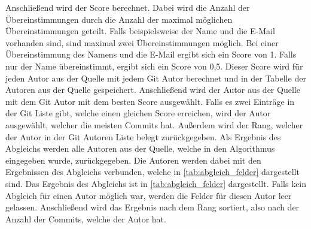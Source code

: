 Anschließend wird der Score berechnet.
Dabei wird die Anzahl der Übereinstimmungen durch die Anzahl der maximal möglichen Übereinstimmungen geteilt.
Falls beispielsweise der Name und die E-Mail vorhanden sind, sind maximal zwei Übereinstimmungen möglich.
Bei einer Übereinstimmung des Namens und die E-Mail ergibt sich ein Score von 1.
Falls nur der Name übereinstimmt, ergibt sich ein Score von 0,5.
Dieser Score wird für jeden Autor aus der Quelle mit jedem Git Autor berechnet und in der Tabelle der Autoren aus der Quelle gespeichert.
Anschließend wird der Autor aus der Quelle mit dem Git Autor mit dem besten Score ausgewählt.
Falls es zwei Einträge in der Git Liste gibt, welche einen gleichen Score erreichen, wird der Autor ausgewählt, welcher die meisten Commits hat.
Außerdem wird der Rang, welcher der Autor in der Git Autoren Liste belegt zurückgegeben.
Als Ergebnis des Abgleichs werden alle Autoren aus der Quelle, welche in den Algorithmus eingegeben wurde, zurückgegeben.
Die Autoren werden dabei mit den Ergebnissen des Abgleichs verbunden, welche in \autoref{tab:abgleich_felder} dargestellt sind.
Das Ergebnis des Abgleichs ist in \autoref{tab:abgleich_felder} dargestellt.
Falls kein Abgleich für einen Autor möglich war, werden die Felder für diesen Autor leer gelassen.
Anschließend wird das Ergebnis nach dem Rang sortiert, also nach der Anzahl der Commits, welche der Autor hat.

